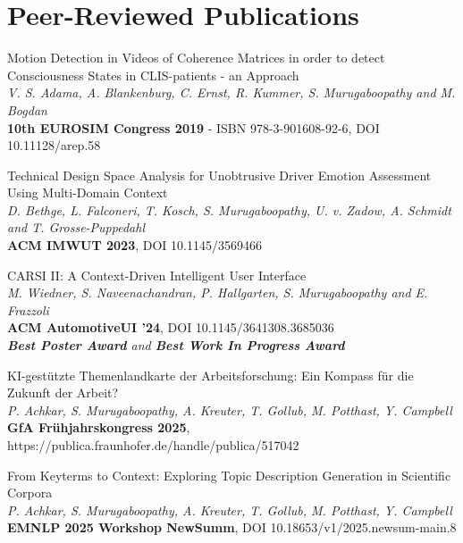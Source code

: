 \documentclass[margin,line]{resume}
\begin{document}
\begin{resume}
\begin{list2}
        \end{list2}

    \section{\mysidestyle \normalsize{Peer-Reviewed Publications}}
        \begin{list2}\setlength\itemsep{0.75mm}
            \item Motion Detection in Videos of Coherence Matrices in order to detect Consciousness States in CLIS-patients - an Approach\\
            \textsl{V. S. Adama, A. Blankenburg, C. Ernst, R. Kummer, S. Murugaboopathy and M. Bogdan}\\
            \textbf{10th EUROSIM Congress 2019} - ISBN 978-3-901608-92-6, DOI 10.11128/arep.58\\
            
            \item Technical Design Space Analysis for Unobtrusive Driver Emotion Assessment Using Multi-Domain Context\\
            \textsl{D. Bethge, L. Falconeri, T. Kosch, S. Murugaboopathy, U. v. Zadow, A. Schmidt and T. Grosse-Puppedahl}\\
            \textbf{ACM IMWUT 2023}, DOI 10.1145/3569466

            \newpage

            \item CARSI II: A Context-Driven Intelligent User Interface\\
            \textsl{M. Wiedner, S. Naveenachandran, P. Hallgarten, S. Murugaboopathy and E. Frazzoli}\\
            \textbf{ACM AutomotiveUI '24}, DOI 10.1145/3641308.3685036\\
            \textsl{\textbf{Best Poster Award} and \textbf{Best Work In Progress Award}}
            
            \item KI-gest\"utzte Themenlandkarte der Arbeitsforschung: Ein Kompass f\"ur die Zukunft der Arbeit?\\
            \textsl{P. Achkar, S. Murugaboopathy, A. Kreuter, T. Gollub, M. Potthast, Y. Campbell}\\
            \textbf{GfA Fr\"uhjahrskongress 2025}, https://publica.fraunhofer.de/handle/publica/517042
            
            \item From Keyterms to Context: Exploring Topic Description Generation in Scientific Corpora\\
            \textsl{P. Achkar, S. Murugaboopathy, A. Kreuter, T. Gollub, M. Potthast, Y. Campbell}\\
            \textbf{EMNLP 2025 Workshop NewSumm}, DOI 10.18653/v1/2025.newsum-main.8


\end{list2}
\end{resume}
\end{document}
